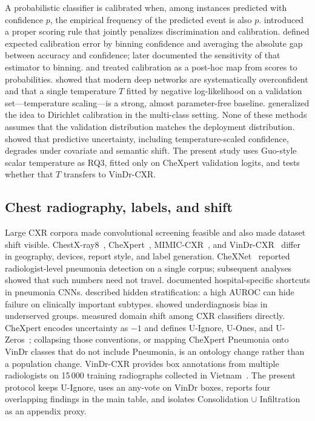 \documentclass[11pt,a4paper]{article}
\begin{document}
A probabilistic classifier is calibrated when, among instances predicted with confidence $p$, the empirical frequency of the predicted event is also $p$. \citet{brier1950verification} introduced a proper scoring rule that jointly penalizes discrimination and calibration. \citet{naeini2015ece} defined expected calibration error by binning confidence and averaging the absolute gap between accuracy and confidence; \citet{nixon2019measuring} later documented the sensitivity of that estimator to binning. \citet{platt1999probabilistic} and \citet{zadrozny2002transforming} treated calibration as a post-hoc map from scores to probabilities. \citet{guo2017calibration} showed that modern deep networks are systematically overconfident and that a single temperature $T$ fitted by negative log-likelihood on a validation set---temperature scaling---is a strong, almost parameter-free baseline. \citet{kull2019dirichlet} generalized the idea to Dirichlet calibration in the multi-class setting. None of these methods assumes that the validation distribution matches the deployment distribution. \citet{ovadia2019shift} showed that predictive uncertainty, including temperature-scaled confidence, degrades under covariate and semantic shift. The present study uses Guo-style scalar temperature as RQ3, fitted only on CheXpert validation logits, and tests whether that $T$ transfers to VinDr-CXR.

\subsection{Chest radiography, labels, and shift}

Large CXR corpora made convolutional screening feasible and also made dataset shift visible. ChestX-ray8~\citep{wang2017chestxray8}, CheXpert~\citep{irvin2019chexpert}, MIMIC-CXR~\citep{johnson2019mimiccxr}, and VinDr-CXR~\citep{nguyen2022vindrcxr} differ in geography, devices, report style, and label generation. CheXNet~\citep{rajpurkar2017chexnet} reported radiologist-level pneumonia detection on a single corpus; subsequent analyses showed that such numbers need not travel. \citet{zech2018variable} documented hospital-specific shortcuts in pneumonia CNNs. \citet{oakden2020hidden} described hidden stratification: a high AUROC can hide failure on clinically important subtypes. \citet{seyyed2021underdiagnosis} showed underdiagnosis bias in underserved groups. \citet{pooch2020shift} measured domain shift among CXR classifiers directly. CheXpert encodes uncertainty as $-1$ and defines U-Ignore, U-Ones, and U-Zeros~\citep{irvin2019chexpert}; collapsing those conventions, or mapping CheXpert Pneumonia onto VinDr classes that do not include Pneumonia, is an ontology change rather than a population change. VinDr-CXR provides box annotations from multiple radiologists on 15\,000 training radiographs collected in Vietnam~\citep{nguyen2022vindrcxr}. The present protocol keeps U-Ignore, uses an any-vote on VinDr boxes, reports four overlapping findings in the main table, and isolates Consolidation $\cup$ Infiltration as an appendix proxy.
\end{document}
